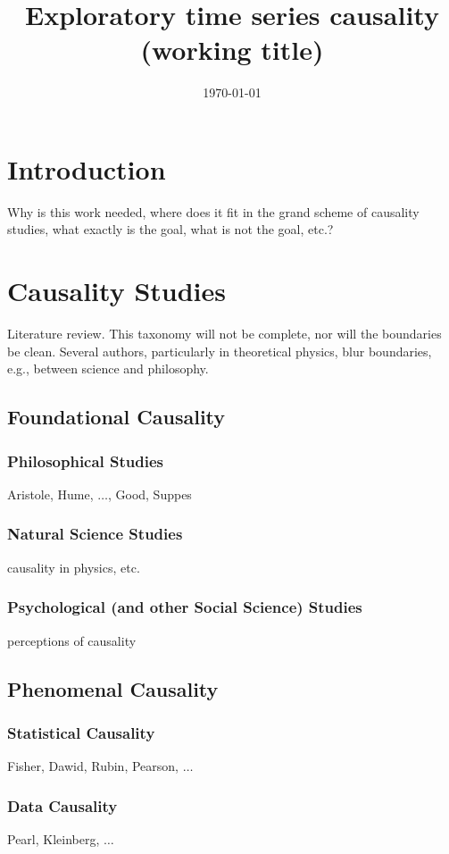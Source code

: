 \documentclass{article}[10pt]
\title{Exploratory time series causality (working title)}
\author{}
\date{\today}
\begin{document}
\maketitle
\tableofcontents


\section{Introduction} 
Why is this work needed, where does it fit in the grand scheme of causality studies, what exactly is the goal, what is not the goal, etc.?

\section{Causality Studies} 
Literature review.  This taxonomy will not be complete, nor will the boundaries be clean.  Several authors, particularly in theoretical physics, blur boundaries, e.g., between science and philosophy.

\subsection{Foundational Causality} 
\subsubsection{Philosophical Studies} 
Aristole, Hume, $\ldots$, Good, Suppes

\subsubsection{Natural Science Studies} 
causality in physics, etc.

\subsubsection{Psychological (and other Social Science) Studies} 
perceptions of causality

\subsection{Phenomenal Causality}
\subsubsection{Statistical Causality} 
Fisher, Dawid, Rubin, Pearson, $\ldots$

\subsubsection{Data Causality} 
Pearl, Kleinberg, $\ldots$
\end{document}
